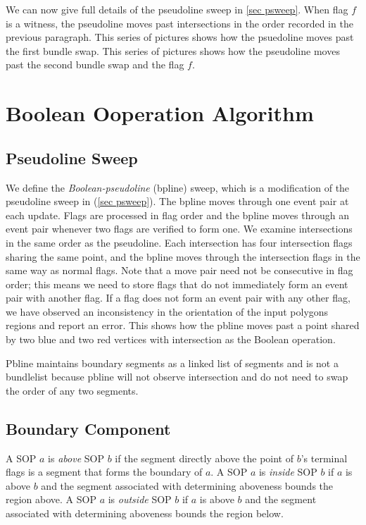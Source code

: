 \documentclass[11pt]{article}
\begin{document}
We can now give full details of the pseudoline sweep in \ref{sec psweep}.
When flag $f$ is a witness, the pseudoline moves past intersections in the order recorded in the previous paragraph.
This series of pictures shows how the psuedoline moves past the first bundle swap.
This series of pictures shows how the pseudoline moves past the second bundle swap and the flag $f$.

\section{Boolean Ooperation Algorithm}
\subsection{Pseudoline Sweep} \label{sec psweep2}
We define the \textit{Boolean-pseudoline} (bpline) sweep, which is a modification of the pseudoline sweep in (\ref{sec psweep}).
The bpline moves through one event pair at each update.
Flags are processed in flag order and the bpline moves through an event pair whenever two flags are verified to form one.
We examine intersections in the same order as the pseudoline.
Each intersection has four intersection flags sharing the same point, and the bpline moves through the intersection flags in the same way as normal flags.
Note that a move pair need not be consecutive in flag order; this means we need to store flags that do not immediately form an event pair with another flag.
If a flag does not form an event pair with any other flag, we have observed an inconsistency in the orientation of the input polygons regions and report an error.
This shows how the pbline moves past a point shared by two blue and two red vertices with intersection as the Boolean operation.

Pbline maintains boundary segments as a linked list of segments and is not a bundlelist because pbline will not observe intersection and do not need to swap the order of any two segments.





\subsection{Boundary Component} \label{sec bcycle}
A SOP $a$ is \textit{above} SOP $b$ if the segment directly above the point of $b$'s terminal flags is a segment that forms the boundary of $a$.
A SOP $a$ is \textit{inside} SOP $b$ if $a$ is above $b$ and the segment associated with determining aboveness bounds the region above.
A SOP $a$ is \textit{outside} SOP $b$ if $a$ is above $b$ and the segment associated with determining aboveness bounds the region below.
\end{document}

